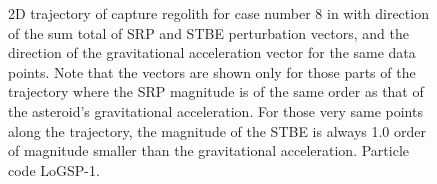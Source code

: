 \FloatBarrier
\begin{figure}[htb]
\centering
\captionsetup{justification=centering}
\caption{2D trajectory of capture regolith for case number 8 in  with direction of the sum total of \gls{SRP} and \gls{STBE} perturbation vectors, and the direction of the gravitational acceleration vector for the same data points. Note that the vectors are shown only for those parts of the trajectory where the \gls{SRP} magnitude is of the same order as that of the asteroid's gravitational acceleration. For those very same points along the trajectory, the magnitude of the \gls{STBE} is always 1.0 order of magnitude smaller than the gravitational acceleration. Particle code LoGSP-1.}
\label{fig:LoGSP_1_capture_case_8_2d_trajectory_totalPerturbations_and_gravity_vectors}
\end{figure}
